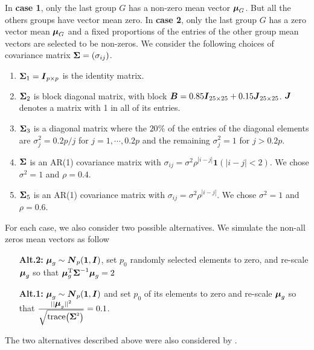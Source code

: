 \documentclass[12pt]{article}
\def\diag{\hbox{diag}}
\def\diag{\hbox{diag}}
\def\trace{\hbox{trace}}
\def\diag{\hbox{diag}}
\def\diag{\hbox{diag}}
\def\trace{\hbox{trace}}
\def\trans{^{\rm T}}
\def\bone{{\mathbf 1}}
\newcommand{\uB}       {\mbox{\boldmath$B$}}
\newcommand{\uD}       {\mbox{\boldmath$D$}}
\newcommand{\uI}       {\mbox{\boldmath$I$}}
\newcommand{\uJ}       {\mbox{\boldmath$J$}}
\newcommand{\uN}       {\mbox{\boldmath$N$}}
\newcommand{\umu}               {\mbox{\boldmath$\mu$}}
\newcommand{\uSigma}            {\mbox{\boldmath$\Sigma$}}
\begin{document}
In \textbf{case 1}, only the last group $G$ has a non-zero mean vector $\umu_G$. But all the others groups have vector mean zero. In \textbf{case 2}, only the last group $G$ has a zero vector mean $\umu_{G}$ and a fixed proportions of the entries of the other group mean vectors are selected to be non-zeros.  
We consider the following choices of covariance matrix $\uSigma=(\sigma_{ij})$.
\begin{enumerate}
  \item $\uSigma_{1} = \uI_{p \times p} $ is the identity matrix.
  \item $\uSigma_{2} $ is block diagonal matrix, with block $\uB = 0.85\uI_{25 \times 25} + 0.15\uJ_{25 \times 25}$. $\uJ$ denotes a matrix with 1 in all of its entries.
  \item $\uSigma_{3}$ is a diagonal matrix where the $20\%$ of the entries of the diagonal elements are $\sigma^2_j = 0.2p/j$ for $j = 1, \cdots, 0.2p$ and the remaining $\sigma^2_j = 1$ for $j > 0.2p$.
  \item $\uSigma$ is an AR(1) covariance matrix with $\sigma_{ij}=\sigma^2\rho^{|i - j|}\bone(|i-j| < 2)$. We chose $\sigma^2 = 1$ and $\rho = 0.4$.
  \item $\uSigma_{5}$ is an AR(1) covariance matrix with $\sigma_{ij}=\sigma^2\rho^{|i - j|}$. We chose $\sigma^2 = 1$ and $\rho = 0.6$.
\end{enumerate}
For each case, we also consider two possible alternatives. We simulate the non-all zeros mean vectors as follow
\begin{enumerate}[label=(\alph*)]
 \item[{\bf Alt.2:}]  $\umu_g \sim \uN_{p}(\bf{1}, \uI)$, set $p_0$ randomly selected elements to zero, and re-scale $\umu_g$ so that $\umu_g \trans\uSigma ^{-1}  \umu_g = 2$ 
 \item[{\bf Alt.1:}] $\umu_g \sim \uN_{p}(\bf{1}, \uI)$ and set $p_0$ of its elements to zero and re-scale $\umu_g$ so that $\frac{||\umu_{g}||^{2}}{\sqrt{\trace\left( \uSigma ^{2}\right)}} = 0.1$.
\end{enumerate}
The two alternatives described above were also considered by \citet{srivastava2014raptt,zoh2018powerful}.
\end{document}
